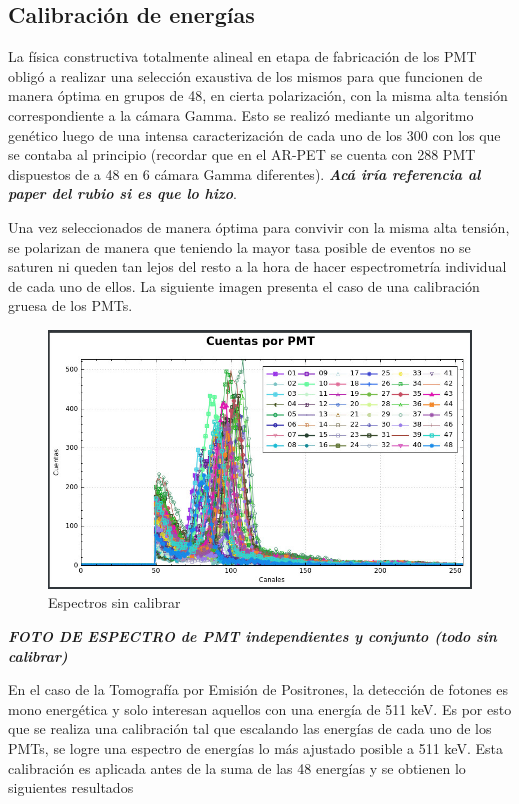 \documentclass[conference]{IEEEtran}
\begin{document}
\subsection{Calibración de energías}

La física constructiva totalmente alineal en etapa de fabricación de los PMT obligó a realizar una selección exaustiva de los mismos para que funcionen de manera óptima en grupos de 48, en cierta polarización, con la misma alta tensión correspondiente a la cámara Gamma. Esto se realizó mediante un algoritmo genético luego de una intensa caracterización de cada uno de los 300 con los que se contaba al principio (recordar que en el AR-PET se cuenta con 288 PMT dispuestos de a 48 en 6 cámara Gamma diferentes). \textit{\textbf{Acá iría referencia al paper del rubio si es que lo hizo}}.

Una vez seleccionados de manera óptima para convivir con la misma alta tensión, se polarizan de manera que teniendo la mayor tasa posible de eventos no se saturen ni queden tan lejos del resto a la hora de hacer espectrometría individual de cada uno de ellos. La siguiente imagen presenta el caso de una calibración gruesa de los PMTs.

\begin{figure}[h]
\centering
\includegraphics[scale=0.2]{Espectro_Sin_Calibrar.jpeg}
\caption{Espectros sin calibrar}
\label{fig:Espectros sin calibrar}
\end{figure}

\textbf{\textit{FOTO DE ESPECTRO de PMT independientes y conjunto (todo sin calibrar)}}

En el caso de la Tomografía por Emisión de Positrones, la detección de fotones es mono energética y solo interesan aquellos con una energía de 511 keV. Es por esto que se realiza una calibración tal que escalando las energías de cada uno de los PMTs, se logre una espectro de energías lo más ajustado posible a 511 keV. Esta calibración es aplicada antes de la suma de las 48 energías y se obtienen lo siguientes resultados
\end{document}
